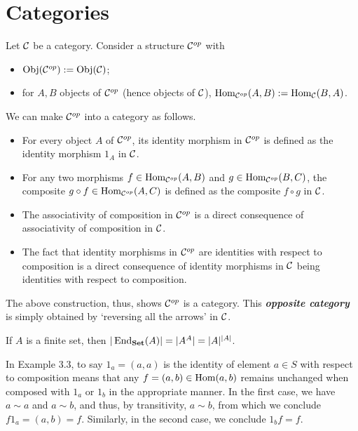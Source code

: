 \section{Categories}
\begin{xca}
Let $\mathcal{C}$ be a category. Consider a structure $\mathcal{C}^{op}$ with
\begin{itemize}
    \item $\operatorname{Obj}(\mathcal{C}^{op}) := \operatorname{Obj}(\mathcal{C})$;
    \item for $A, B$ objects of $\mathcal{C}^{op}$ (hence objects of $\mathcal{C}$),
    $\operatorname{Hom}_{\mathcal{C}^{op}}(A, B) := \operatorname{Hom}_{\mathcal{C}}(B, A)$.
\end{itemize}
We can make $\mathcal{C}^{op}$ into a category as follows.
\begin{itemize}
    \item For every object $A$ of $\mathcal{C}^{op}$, its identity morphism in
    $\mathcal{C}^{op}$ is defined as the identity morphism $1_A$ in $\mathcal{C}$.
    \item For any two morphisms $f \in \operatorname{Hom}_{\mathcal{C}^{op}}(A, B)$ and $g \in
    \operatorname{Hom}_{\mathcal{C}^{op}}(B, C)$, the composite $g \circ f \in
    \operatorname{Hom}_{\mathcal{C}^{op}}(A, C)$ is defined as the composite $f \circ g$ in
    $\mathcal{C}$.
    \item The associativity of composition in $\mathcal{C}^{op}$ is a direct
    consequence of associativity of composition in $\mathcal{C}$.
    \item The fact that identity morphisms in $\mathcal{C}^{op}$ are identities with
    respect to composition is a direct consequence of identity morphisms in
    $\mathcal{C}$ being identities with respect to composition.
\end{itemize}
The above construction, thus, shows $\mathcal{C}^{op}$ is a category. This
\emph{\textbf{opposite category}} is simply obtained by `reversing all the
arrows' in $\mathcal{C}$.
\end{xca}

\begin{xca}
If $A$ is a finite set, then $|\operatorname{End}_{\mathbf{Set}}(A)| = |A^A| = |A|^{|A|}$.
\end{xca}

\begin{xca}
In Example 3.3, to say $1_a = (a, a)$ is the identity of element $a \in S$ with
respect to composition means that any $f = (a, b) \in \operatorname{Hom}(a, b)$ remains
unchanged when composed with $1_a$ or $1_b$ in the appropriate manner. In the
first case, we have $a \sim a$ and $a \sim b$, and thus, by transitivity, $a
\sim b$, from which we conclude $f 1_a = (a, b) = f$. Similarly, in the second
case, we conclude $1_b f = f$.
\end{xca}

